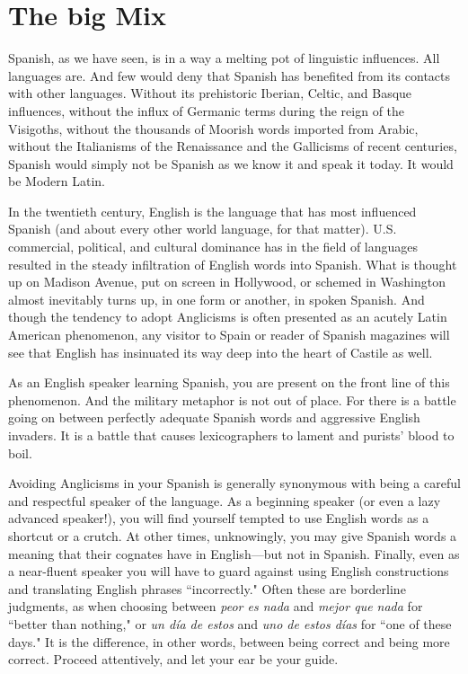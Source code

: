 \chapter{The big Mix}

Spanish, as we have seen, is in a way a melting pot of linguistic influences. All languages are. And few would deny that Spanish has
benefited from its contacts with other languages. Without its prehistoric Iberian, Celtic, and Basque influences, without the influx of Germanic terms during the reign of the Visigoths, without the thousands
of Moorish words imported from Arabic, without the Italianisms of
the Renaissance and the Gallicisms of recent centuries, Spanish would
simply not be Spanish as we know it and speak it today. It would be
Modern Latin.

In the twentieth century, English is the language that has most
influenced Spanish (and about every other world language, for that matter). U.S. commercial, political, and cultural dominance has in the field
of languages resulted in the steady infiltration of English words into
Spanish. What is thought up on Madison Avenue, put on screen in
Hollywood, or schemed in Washington almost inevitably turns up, in
one form or another, in spoken Spanish. And though the tendency to
adopt Anglicisms is often presented as an acutely Latin American phenomenon, any visitor to Spain or reader of Spanish magazines will see
that English has insinuated its way deep into the heart of Castile
as well.

As an English speaker learning Spanish, you are present on the
front line of this phenomenon. And the military metaphor is not out of
place. For there is a battle going on between perfectly adequate Spanish
words and aggressive English invaders. It is a battle that causes lexicographers to lament and purists' blood to boil.

Avoiding Anglicisms in your Spanish is generally synonymous
with being a careful and respectful speaker of the language. As a beginning speaker (or even a lazy advanced speaker!), you will find yourself
tempted to use English words as a shortcut or a crutch. At other times,
unknowingly, you may give Spanish words a meaning that their cognates have in English---but not in Spanish. Finally, even as a near-fluent speaker you will have to guard against using English constructions and translating English phrases ``incorrectly." Often these are
borderline judgments, as when choosing between \emph{peor es nada} and
\emph{mejor que nada} for ``better than nothing," or \emph{un día de estos} and
\emph{uno de estos días} for ``one of these days." It is the difference, in other
words, between being correct and being more correct. Proceed attentively, and let your ear be your guide.

